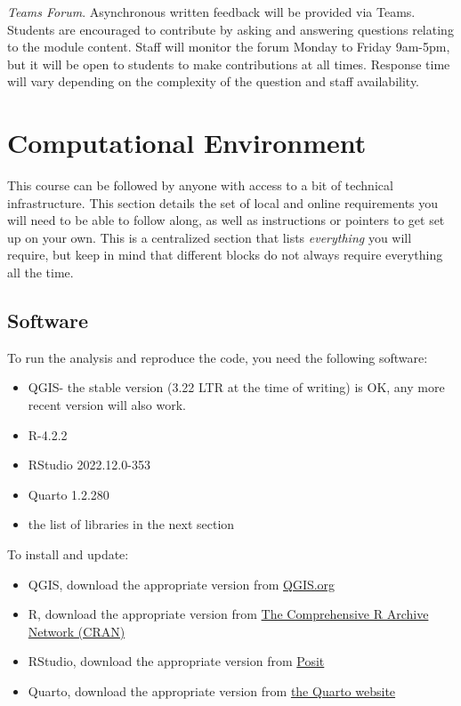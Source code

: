 \documentclass[
  letterpaper,
  DIV=11,
  numbers=noendperiod]{scrreprt}
\providecommand{\tightlist}{%
  \setlength{\itemsep}{0pt}\setlength{\parskip}{0pt}}\usepackage{longtable,booktabs,array}
\begin{document}
\emph{Teams Forum}. Asynchronous written feedback will be provided via
Teams. Students are encouraged to contribute by asking and answering
questions relating to the module content. Staff will monitor the forum
Monday to Friday 9am-5pm, but it will be open to students to make
contributions at all times. Response time will vary depending on the
complexity of the question and staff availability.

\hypertarget{computational-environment}{%
\section*{Computational Environment}\label{computational-environment}}


This course can be followed by anyone with access to a bit of technical
infrastructure. This section details the set of local and online
requirements you will need to be able to follow along, as well as
instructions or pointers to get set up on your own. This is a
centralized section that lists \emph{everything} you will require, but
keep in mind that different blocks do not always require everything all
the time.

\hypertarget{software}{%
\subsection*{Software}\label{software}}

To run the analysis and reproduce the code, you need the following
software:

\begin{itemize}
\tightlist
\item
  QGIS- the stable version (3.22 LTR at the time of writing) is OK, any
  more recent version will also work.
\item
  R-4.2.2
\item
  RStudio 2022.12.0-353
\item
  Quarto 1.2.280
\item
  the list of libraries in the next section
\end{itemize}

To install and update:

\begin{itemize}
\tightlist
\item
  QGIS, download the appropriate version from
  \href{https://www.qgis.org/en/site/forusers/download.html}{QGIS.org}
\item
  R, download the appropriate version from
  \href{https://cran.r-project.org}{The Comprehensive R Archive Network
  (CRAN)}
\item
  RStudio, download the appropriate version from
  \href{https://posit.co/download/rstudio-desktop/}{Posit}
\item
  Quarto, download the appropriate version from
  \href{https://quarto.org/docs/get-started/}{the Quarto website}
\end{itemize}
\end{document}
